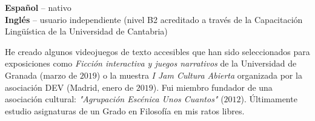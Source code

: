 \documentclass[9pt]{developercv} %
\begin{document}
%
%

\begin{minipage}[t]{0.35\textwidth}
	\vspace{-\baselineskip} %

	
	\textbf{Español} -- nativo\\
	\textbf{Inglés} -- usuario independiente (nivel B2 acreditado a través de la Capacitación Lingüística de la Universidad de Cantabria)\\
\end{minipage}
\hfill
\begin{minipage}[t]{0.6\textwidth}
	\vspace{-\baselineskip} %
	

	He creado algunos videojuegos de texto accesibles que han sido seleccionados para exposiciones como \emph{Ficción interactiva y juegos narrativos} de la Universidad de Granada (marzo de $2019$) o la muestra \emph{I Jam Cultura Abierta} organizada por la asociación DEV (Madrid, enero de $2019$). Fui miembro fundador de una asociación cultural: \emph{"Agrupación Escénica Unos Cuantos"} ($2012$). Últimamente estudio asignaturas de un Grado en Filosofía en mis ratos libres.
\end{minipage}
\end{document}
